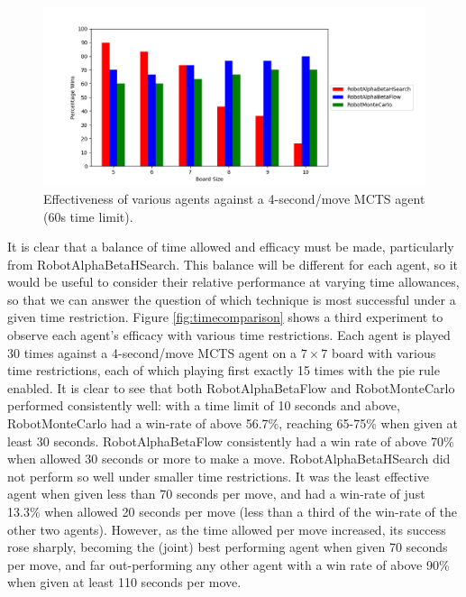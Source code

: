 \begin{figure}
    \centering
    \includegraphics[scale = 0.6]{images/NEWCOMPARISON2.png}
    \caption{Effectiveness of various agents against a 4-second/move MCTS agent (60s time limit).}
    \label{fig:comparison2}
\end{figure}



It is clear that a balance of time allowed and efficacy must be made, particularly from RobotAlphaBetaHSearch. This balance will be different for each agent, so it would be useful to consider their relative performance at varying time allowances, so that we can answer the question of which technique is most successful under a given time restriction. Figure \ref{fig:timecomparison} shows a third experiment to observe each agent's efficacy with various time restrictions. Each agent is played 30 times against a 4-second/move MCTS agent on a $7\times7$ board with various time restrictions, each of which playing first exactly 15 times with the pie rule enabled. It is clear to see that both RobotAlphaBetaFlow and RobotMonteCarlo performed consistently well: with a time limit of 10 seconds and above, RobotMonteCarlo had a win-rate of above 56.7\%, reaching 65-75\% when given at least 30 seconds. RobotAlphaBetaFlow consistently had a win rate of above 70\% when allowed 30 seconds or more to make a move. RobotAlphaBetaHSearch did not perform so well under smaller time restrictions. It was the least effective agent when given less than 70 seconds per move, and had a win-rate of just 13.3\% when allowed 20 seconds per move (less than a third of the win-rate of the other two agents). However, as the time allowed per move increased, its success rose sharply, becoming the (joint) best performing agent when given 70 seconds per move, and far out-performing any other agent with a win rate of above 90\% when given at least 110 seconds per move.


